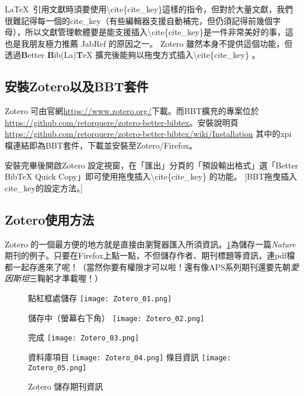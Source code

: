 \documentclass[class=NCU_thesis, crop=false, float=true]{standalone}
\begin{document}
\LaTeX\  引用文獻時須要使用\textbackslash{}cite\{cite\_key\}這樣的指令，但對於大量文獻，我們很難記得每一個的cite\_key（有些編輯器支援自動補完，但仍須記得前幾個字母），所以文獻管理軟體要是能支援插入\textbackslash{}cite\{cite\_key\}是一件非常美好的事，這也是我朋友極力推薦 JabRef 的原因之一。 Zotero 雖然本身不提供這個功能，但透過\textbf{B}etter \textbf{B}ib(La)\textbf{T}eX 擴充後能夠以拖曳方式插入\textbackslash{}cite\{cite\_key\} 。

\subsection{安裝Zotero以及BBT套件}
Zotero 可由官網\url{https://www.zotero.org/}下載。而BBT擴充的專案位於\url{https://github.com/retorquere/zotero-better-bibtex}。安裝說明頁 \url{https://github.com/retorquere/zotero-better-bibtex/wiki/Installation} 其中的xpi檔連結即為BBT套件，下載並安裝至Zotero/Firefox。

安裝完畢後開啟Zotero 設定視窗，在「匯出」分頁的「預設輸出格式」選「Better BibTeX Quick Copy」即可使用拖曳插入\textbackslash{}cite\{cite\_key\} 的功能。
[BBT拖曳插入cite\_key的設定方法。]
\subsection{Zotero使用方法}
Zotero 的一個最方便的地方就是直接由瀏覽器匯入所須資訊。\cref{fig:zotero_save}為儲存一篇\emph{Nature}期刊的例子。只要在Firefox上點一點，不但儲存作者、期刊標題等資訊，連pdf檔都一起存進來了呢！（當然你要有權限才可以啦！還有像APS系列期刊還要先朝\emph{愛因斯坦}三鞠躬才準載喔！）
\begin{figure}
    \centering
    \subcaptionbox
        {點紅框處儲存
        \label{fig:Zotero_01}}
        {\texttt{[image: Zotero\_01.png]}}
        
    \vspace{\baselineskip}
    \subcaptionbox
        {儲存中（螢幕右下角）
        \label{fig:Zotero_02}}
        {\texttt{[image: Zotero\_02.png]}}
        
    \vspace{\baselineskip} %
    \subcaptionbox
        {完成
        \label{fig:Zotero_03}}
        {\texttt{[image: Zotero\_03.png]}}
    
    \vspace{\baselineskip} %
    \subcaptionbox
        {資料庫項目
        \label{fig:Zotero_04}}
        {\texttt{[image: Zotero\_04.png]}}
    \hspace{0.8cm}
    \subcaptionbox
        {條目資訊
        \label{fig:Zotero_05}}
        {\texttt{[image: Zotero\_05.png]}}
    \caption{Zotero 儲存期刊資訊}
    \label{fig:zotero_save}
\end{figure}
\end{document}
